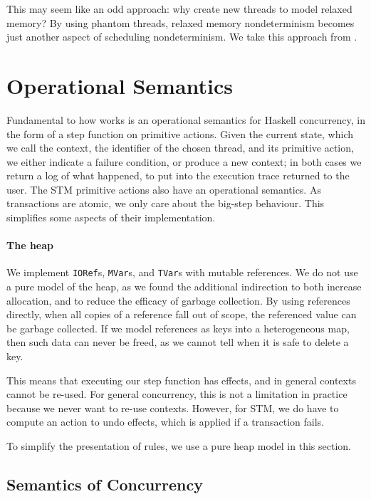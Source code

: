 This may seem like an odd approach: why create new threads to model
relaxed memory?  By using phantom threads, relaxed memory
nondeterminism becomes just another aspect of scheduling
nondeterminism.  We take this approach from \cite{zhang2015}.

\section{Operational Semantics}
\label{sec:dejafu-semantics}

Fundamental to how \dejafu{} works is an operational semantics for
Haskell concurrency, in the form of a step function on primitive
actions.  Given the current state, which we call the context, the
identifier of the chosen thread, and its primitive action, we either
indicate a failure condition, or produce a new context; in both cases
we return a log of what happened, to put into the execution trace
returned to the user.  The STM primitive actions also have an
operational semantics.  As transactions are atomic, we only care about
the big-step behaviour.  This simplifies some aspects of their
implementation.

\paragraph{The heap}
We implement \verb|IORef|s, \verb|MVar|s, and \verb|TVar|s with mutable
references.  We do not use a pure model of the heap, as we found the
additional indirection to both increase allocation, and to reduce the
efficacy of garbage collection.  By using references directly, when
all copies of a reference fall out of scope, the referenced value can
be garbage collected.  If we model references as keys into a
heterogeneous map, then such data can never be freed, as we cannot
tell when it is safe to delete a key.

This means that executing our step function has effects, and in
general contexts cannot be re-used.  For general concurrency, this is
not a limitation in practice because we never want to re-use contexts.
However, for STM, we do have to compute an action to undo effects,
which is applied if a transaction fails.

To simplify the presentation of rules, we use a pure heap model in
this section.

\subsection{Semantics of Concurrency}

